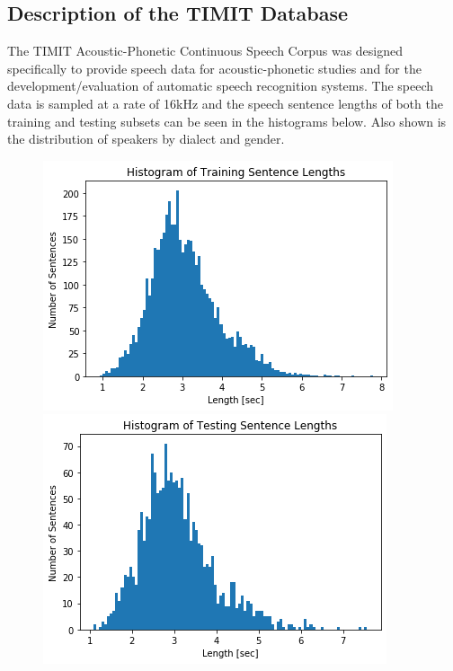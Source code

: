 \documentclass{article}
\begin{document}
\subsection{Description of the TIMIT Database}
The TIMIT Acoustic-Phonetic Continuous Speech Corpus was designed specifically to provide speech data for acoustic-phonetic studies and for the development/evaluation of automatic speech recognition systems. 
The speech data is sampled at a rate of 16kHz and the speech sentence lengths of both the training and testing subsets can be seen in the histograms below. 
Also shown is the distribution of speakers by dialect and gender.
\begin{figure}[h!]
  \centering
  \includegraphics[scale=0.32]{train_hist.png}
  \includegraphics[scale=0.32]{test_hist.png}

\end{figure}
\end{document}
